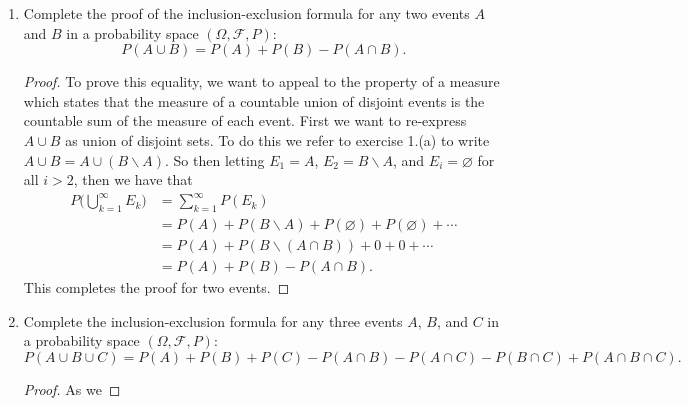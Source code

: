 \documentclass[12pt]{article}
\newenvironment{solution}
{\renewcommand\qedsymbol{$\blacksquare$}\begin{proof}[Solution]}
{\end{proof}}
\begin{document}
\begin{enumerate}
\begin{enumerate}[(a)]
\begin{proof}
    \end{proof} \item Let $L$ be as in part (a). Is $(\Omega, L)$ a measurable
    space? In other words, is $L$ a $\sigma$-algebra on $\Omega$?
    \begin{solution} As a counter example, let $\Omega=\{0, 1\}$ and let
        $\mathcal{F}=\{\varnothing, \Omega\}$. If $B=\{0\}$, then
        $L=\{\varnothing, \{0\}\}$ which is not a $\sigma$-algebra on $\Omega$
        since $\{0\}^c=\{1\}\notin L$ and so $L$ is not closed under
        complementations.  \end{solution} \end{enumerate} \item Complete the
        proof of the inclusion-exclusion formula for any two events $A$ and $B$
        in a probability space $(\Omega, \mathcal{F}, P)$: \begin{equation*}
            P(A\cup B)=P(A)+P(B)-P(A\cap B).  \end{equation*} \begin{proof} To
                prove this equality, we want to appeal to the property of
                a measure which states that the measure of a countable union of
                disjoint events is the countable sum of the measure of each
                event. First we want to re-express $A\cup B$ as union of
                disjoint sets. To do this we refer to exercise 1.(a) to write
                $A\cup B=A\cup(B\backslash A)$. So then letting $E_1=A$,
                $E_2=B\backslash A$, and $E_i=\varnothing$ for all $i>2$, then
                we have that \begin{align*}
                    P\big(\bigcup_{k=1}^{\infty}E_k\big)&=\sum_{k=1}^{\infty}P(E_k)
                    \\ &=P(A)+P(B\backslash
                    A)+P(\varnothing)+P(\varnothing)+\cdots \\
            &=P(A)+P(B\backslash(A\cap B))+0+0+\cdots \\ &=P(A)+P(B)-P(A\cap
    B).  \end{align*} This completes the proof for two events.  \end{proof}
\item Complete the inclusion-exclusion formula for any three events $A$, $B$,
    and $C$ in a probability space $(\Omega, \mathcal{F}, P)$:
    \begin{equation*} P(A\cup B\cup C)=P(A)+P(B)+P(C)-P(A\cap B)-P(A\cap
        C)-P(B\cap C)+P(A\cap B\cap C).  \end{equation*} \begin{proof} As we

\end{proof}
\end{enumerate}
\end{document}

